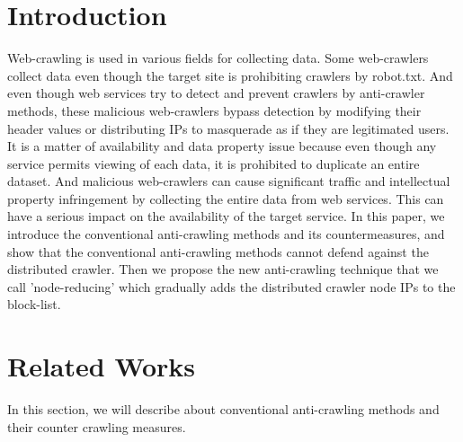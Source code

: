 \documentclass[sigconf,anonymous=true]{acmart}
\begin{document}
%
%
\section{Introduction}
Web-crawling is used in various fields for collecting data. Some web-crawlers collect data even though the target site is prohibiting crawlers by robot.txt. And even though web services try to detect and prevent crawlers by anti-crawler methods, these malicious web-crawlers bypass detection by modifying their header values or distributing IPs to masquerade as if they are legitimated users.
It is a matter of availability and data property issue because even though any service permits viewing of each data, it is prohibited to duplicate an entire dataset. And malicious web-crawlers can cause significant traffic and intellectual property infringement by collecting the entire data from web services. This can have a serious impact on the availability of the target service.
In this paper, we introduce the conventional anti-crawling methods and its countermeasures, and show that the conventional anti-crawling methods cannot defend against the distributed crawler. Then we propose the new anti-crawling technique that we call 'node-reducing' which gradually adds the distributed crawler node IPs to the block-list.

%
%
\section{Related Works}
In this section, we will describe about conventional anti-crawling methods and their counter crawling measures.
\end{document}
